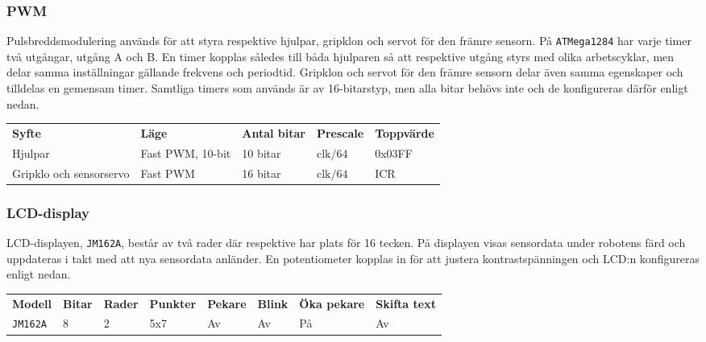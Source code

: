 \documentclass[11pt]{article}
\begin{document}
\begin{flushleft}
\begin{description}[style=unboxed, leftmargin=0cm]
\end{description}


\subsubsection{PWM}
Pulsbreddsmodulering används för att styra respektive hjulpar, gripklon och servot för den främre sensorn. På \verb+ATMega1284+ har varje timer två utgångar, utgång A och B. En timer kopplas således till båda hjulparen så att respektive utgång styrs med olika arbetscyklar, men delar samma inställningar gällande frekvens och periodtid. Gripklon och servot för den främre sensorn delar även samma egenskaper och tilldelas en gemensam timer. Samtliga timers som används är av 16-bitarstyp, men alla bitar behövs inte och de konfigureras därför enligt nedan. 

\begin{center}
\begin{tabular}{l l l l l}

    \textbf{Syfte} & \textbf{Läge} & \textbf{Antal bitar} & \textbf{Prescale} & \textbf{Toppvärde} \\
    Hjulpar & Fast PWM, 10-bit & 10 bitar & $\text{clk}/64$ &  0x03FF \\
	Gripklo och sensorservo & Fast PWM & 16 bitar & $\text{clk}/64$  & ICR \\
\end{tabular}
\end{center}

\subsubsection{LCD-display}
LCD-displayen, \verb+JM162A+, består av två rader där respektive har plats för 16 tecken. På displayen visas sensordata under robotens färd och uppdateras i takt med att nya sensordata anländer. En potentiometer kopplas in för att justera kontrastspänningen och LCD:n konfigureras enligt nedan.

\begin{center}
  \begin{tabular}{l l l l l l l l}
      \textbf{Modell} & \textbf{Bitar} & \textbf{Rader} & \textbf{Punkter} & \textbf{Pekare} & \textbf{Blink} & \textbf{Öka pekare} & \textbf{Skifta text} \\
      \verb+JM162A+ & 8 & 2 & 5x7 & Av & Av & På & Av \\
    \end{tabular}
  \end{center}


\end{flushleft}
\end{document}
